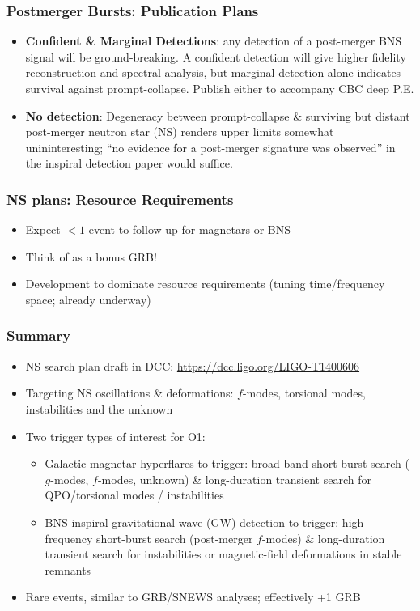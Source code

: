 \documentclass{beamer}
\def\gw#1{gravitational wave#1 (GW#1)\gdef\gw{GW}}
\def\ns#1{neutron star#1 (NS#1)\gdef\ns{NS}}
\begin{document}
\begin{frame}
    \frametitle{Postmerger Bursts: Publication Plans}
    \begin{itemize}
        \item {\bf Confident \& Marginal Detections}: any detection of a
            post-merger BNS signal will be ground-breaking.  A confident
            detection will give higher fidelity reconstruction and spectral
            analysis, but marginal detection alone indicates survival against
            prompt-collapse.  Publish either to accompany CBC deep P.E.
        \item {\bf No detection}: Degeneracy between prompt-collapse \&
            surviving but distant post-merger \ns{} renders upper limits
            somewhat unininteresting; ``no evidence for a post-merger signature
            was observed'' in the inspiral detection paper would suffice.
    \end{itemize}
\end{frame}

\begin{frame}
    \frametitle{NS plans: Resource Requirements}
    \begin{itemize}
        \item Expect $<1$ event to follow-up for magnetars or BNS
        \item Think of as a bonus GRB!
        \item Development to dominate resource requirements (tuning
            time/frequency space; already underway)
    \end{itemize}
\end{frame}


\begin{frame}
    \frametitle{Summary}
    \small{
    \begin{itemize}
        \item NS search plan draft in DCC: {\small \href{https://dcc.ligo.org/LIGO-T1400606}{https://dcc.ligo.org/LIGO-T1400606}}
        \item Targeting NS oscillations \& deformations: $f$-modes, torsional modes,
            instabilities and the unknown
        \item Two trigger types of interest for O1:
            \begin{itemize}
                \item Galactic magnetar hyperflares to trigger: broad-band short burst
                    search ($g$-modes, $f$-modes, unknown) \&
                    long-duration transient search for QPO/torsional modes / instabilities
                \item BNS inspiral \gw{} detection to trigger: high-frequency short-burst
                    search (post-merger $f$-modes) \& long-duration transient search for
                    instabilities or magnetic-field deformations in stable remnants
            \end{itemize}
    \item Rare events, similar to GRB/SNEWS analyses; effectively +1 GRB
    \end{itemize}
    }

\end{frame}
\end{document}
